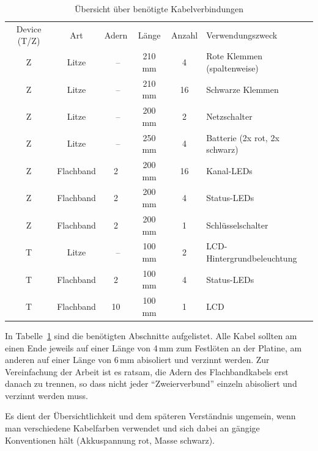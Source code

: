 \documentclass[paper=a4, parskip, numbers=noenddot, toc=listof, headsepline]{scrbook}
\begin{document}
					\begin{table}
						\centering
						\begin{tabularx}{\textwidth}{cccccX}
							\hline\hline
							Device (T/Z) & Art       & Adern & Länge  & Anzahl & Verwendungszweck              \\
							Z            & Litze     & ~--   & 210 mm & 4      & Rote Klemmen (spaltenweise)   \\
							Z            & Litze     & ~--   & 210 mm & 16     & Schwarze Klemmen              \\
							Z            & Litze     & ~--   & 200 mm & 2      & Netzschalter                  \\
							Z            & Litze     & ~--   & 250 mm & 4      & Batterie (2x rot, 2x schwarz) \\
							Z            & Flachband & 2     & 200 mm & 16     & Kanal-LEDs                    \\
							Z            & Flachband & 2     & 200 mm & 4      & Status-LEDs                   \\
							Z            & Flachband & 2     & 200 mm & 1      & Schlüsselschalter             \\ \hline
							T            & Litze     & ~--   & 100 mm & 2      & LCD-Hintergrundbeleuchtung    \\
							T            & Flachband & 2     & 100 mm & 4      & Status-LEDs                   \\
							T            & Flachband & 10    & 100 mm & 1      & LCD                           \\ \hline\hline
						\end{tabularx}
						\caption{Übersicht über benötigte Kabelverbindungen}
						\label{tab:kabel}
					\end{table}

					In Tabelle~\ref{tab:kabel} sind die benötigten Abschnitte aufgelistet. Alle Kabel sollten am einen Ende jeweils auf einer Länge von 4\,mm zum Festlöten an der Platine, am anderen auf einer Länge von 6\,mm abisoliert und verzinnt werden. Zur Vereinfachung der Arbeit ist es ratsam, die Adern des Flachbandkabels erst danach zu trennen, so dass nicht jeder \enquote{Zweierverbund} einzeln abisoliert und verzinnt werden muss.

					Es dient der Übersichtlichkeit und dem späteren Verständnis ungemein, wenn man verschiedene Kabelfarben verwendet und sich dabei an gängige Konventionen hält (Akkuspannung rot, Masse schwarz).
\end{document}
